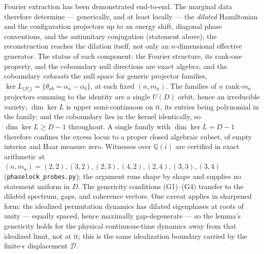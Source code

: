 \documentclass[
]{article}
\begin{document}
Fourier extraction has been demonstrated end-to-end. The marginal data
therefore determine --- generically, and at least locally --- the
\emph{dilated} Hamiltonian and the configuration projectors up to an
energy shift, diagonal phase conventions, and the antiunitary
conjugation (statement above); the reconstruction reaches the dilation
itself, not only an \(n\)-dimensional effective generator. The status of
each component: the Fourier structure, its rank-one property, and the
coboundary null directions are exact algebra; and the coboundary
\emph{exhausts} the null space for generic projector families,
\(\ker L_{\{P_i\}} = \{\theta_{ab} = \alpha_a - \alpha_b\}\), at each
fixed \((n, m_a)\). The families of \(n\) rank-\(m_a\) projectors
summing to the identity are a single \(U(D)\) orbit, hence an
irreducible variety; \(\dim \ker L\) is upper semi-continuous on it, its
entries being polynomial in the family; and the coboundary lies in the
kernel identically, so \(\dim \ker L \geq D-1\) throughout. A single
family with \(\dim \ker L = D-1\) therefore confines the excess locus to
a proper closed algebraic subset, of empty interior and Haar measure
zero. Witnesses over \(\mathbb{Q}(i)\) are certified in exact arithmetic
at \((n,m_a) = (2,2), (3,2), (2,3), (4,2), (2,4), (3,3), (3,4)\)
(\texttt{phaselock\_probes.py}); the argument runs shape by shape and
supplies no statement uniform in \(D\). The genericity conditions
(G1)--(G4) transfer to the dilated spectrum, gaps, and coherence
vectors. One caveat applies in sharpened form: the idealized permutation
dynamics has dilated eigenphases at roots of unity --- equally spaced,
hence maximally gap-degenerate --- so the lemma's genericity holds for
the physical continuous-time dynamics away from that idealized limit,
not at it; this is the same idealization boundary carried by the
finite-\(\epsilon\) displacement \(\mathcal{D}\).
\end{document}
